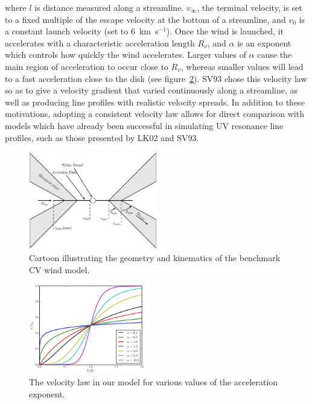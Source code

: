 \documentclass[preprint, a4paper, 11pt]{aastex}
\begin{document}
where $l$ is distance measured along a  streamline. $v_{\infty}$, the 
terminal velocity, is set to a fixed multiple of the escape velocity at the bottom
of a streamline, and $v_0$ is a constant launch velocity (set to $6$~km~s$^{-1}$).
Once the wind is launched, it accelerates with a characteristic acceleration
length $R_v$, and $\alpha$ is an exponent which controls how quickly the 
wind accelerates. Larger values of $\alpha$ cause the main region of 
acceleration to occur close to $R_v$, whereas smaller values will lead
to a fast acceleration close to the disk (see figure~\ref{acc_law}).
SV93 chose this velocity law so as to give a 
velocity gradient that varied continuously along a streamline, as well
as producing line profiles with realistic velocity spreads.
In addition to these motivations, adopting a consistent velocity law 
allows for direct comparison with models which have already been successful in 
simulating UV resonance line profiles, such as those presented by LK02 and SV93.  


\begin{figure}
\centering
\includegraphics[width=0.5\textwidth]{figures/fig2_cartoon.eps}
\caption{Cartoon illustrating the geometry and kinematics of the benchmark CV wind model.}
\label{cartoon}
\end{figure}


\begin{figure}
\centering
\includegraphics[width=0.45\textwidth]{figures/acc_law.eps}
\caption{
The velocity law in our model for various values of
the acceleration exponent.
}
\label{acc_law}
\end{figure}
\end{document}
